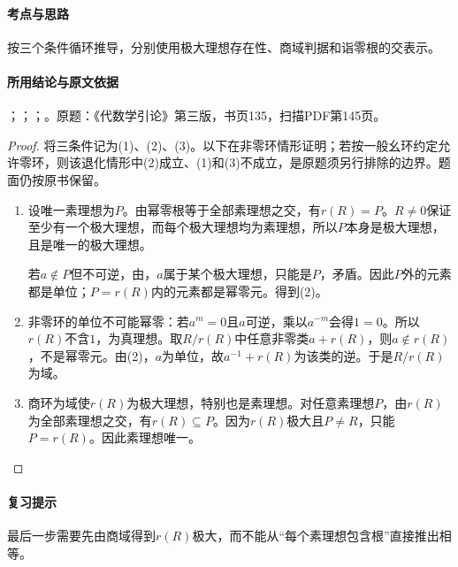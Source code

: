 \paragraph{考点与思路}

按三个条件循环推导，分别使用极大理想存在性、商域判据和诣零根的交表示。

\paragraph{所用结论与原文依据}

；；；。原题：《代数学引论》第三版，书页135，扫描PDF第145页。


\begin{proof}

将三条件记为(1)、(2)、(3)。以下在非零环情形证明；若按一般幺环约定允许零环，则该退化情形中(2)成立、(1)和(3)不成立，是原题须另行排除的边界。题面仍按原书保留。

\begin{enumerate}
\item[(1)$\Rightarrow$(2)] 设唯一素理想为$P$。由幂零根等于全部素理想之交，有$r(R)=P$。$R\ne0$保证至少有一个极大理想，而每个极大理想均为素理想，所以$P$本身是极大理想，且是唯一的极大理想。

若$a\notin P$但不可逆，由，$a$属于某个极大理想，只能是$P$，矛盾。因此$P$外的元素都是单位；$P=r(R)$内的元素都是幂零元。得到(2)。
\item[(2)$\Rightarrow$(3)] 非零环的单位不可能幂零：若$a^m=0$且$a$可逆，乘以$a^{-m}$会得$1=0$。所以$r(R)$不含$1$，为真理想。取$R/r(R)$中任意非零类$a+r(R)$，则$a\notin r(R)$，不是幂零元。由(2)，$a$为单位，故$a^{-1}+r(R)$为该类的逆。于是$R/r(R)$为域。
\item[(3)$\Rightarrow$(1)] 商环为域使$r(R)$为极大理想，特别也是素理想。对任意素理想$P$，由$r(R)$为全部素理想之交，有$r(R)\subseteq P$。因为$r(R)$极大且$P\ne R$，只能$P=r(R)$。因此素理想唯一。
\end{enumerate}

\end{proof}

\paragraph{复习提示}

最后一步需要先由商域得到$r(R)$极大，而不能从“每个素理想包含根”直接推出相等。



